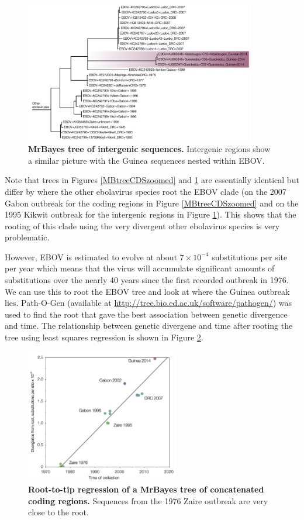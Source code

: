 \documentclass[11pt,oneside,letterpaper]{article}
\begin{document}
\begin{figure}[h!]
\centering  
\includegraphics[width=0.9\textwidth]  {figures/EBOV_intergenic_mb_tree.png}
\caption{\textbf{MrBayes tree of intergenic sequences.}
Intergenic regions show a similar picture with the Guinea sequences nested within EBOV.}
\label{MBtreeIG}
\end{figure}

Note that trees in Figures \ref{MBtreeCDSzoomed} and \ref{MBtreeIG} are essentially identical but differ by where the other ebolavirus species root the EBOV clade (on the 2007 Gabon outbreak for the coding regions in Figure \ref{MBtreeCDSzoomed} and on the 1995 Kikwit outbreak for the intergenic regions in Figure \ref{MBtreeIG}). This shows that the rooting of this clade using the very divergent other ebolavirus species is very problematic. 

However, EBOV is estimated to evolve at about $7\times10^{-4}$ substitutions per site per year \cite{carroll2013} which means that the virus will accumulate significant amounts of substitutions over the nearly 40 years since the first recorded outbreak in 1976.
We can use this to root the EBOV tree and look at where the Guinea outbreak lies.
Path-O-Gen (available at \url{http://tree.bio.ed.ac.uk/software/pathogen/}) was used to find the root that gave the best association between genetic divergence and time.
The relationship between genetic divergene and time after rooting the tree using least squares regression is shown in Figure \ref{MBPath}.

\begin{figure}[h!]
\centering  
\includegraphics[width=0.6\textwidth]  {figures/EBOV_cds_mb_path.png}
\caption{\textbf{Root-to-tip regression of a MrBayes tree of concatenated coding regions.}
Sequences from the 1976 Zaire outbreak are very close to the root.}
\label{MBPath}
\end{figure}
\end{document}
